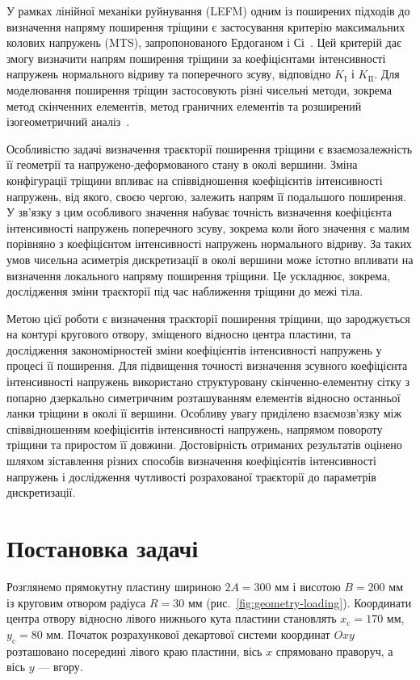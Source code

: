 \documentclass[a4paper,12pt]{article}
\newcommand{\PlateAMM}{300}
\newcommand{\HoleRMM}{30}
\begin{document}
У рамках лінійної механіки руйнування (LEFM) одним із поширених підходів до визначення напряму поширення тріщини
є застосування критерію максимальних колових напружень (MTS), запропонованого Ердоганом і Сі~\cite{ErdoganSih1963}.
Цей критерій дає змогу визначити напрям поширення тріщини за коефіцієнтами інтенсивності напружень нормального відриву
та поперечного зсуву, відповідно $K_{\mathrm I}$ і $K_{\mathrm{II}}$.
Для моделювання поширення тріщин застосовують різні чисельні методи, зокрема метод скінченних елементів,
метод граничних елементів та розширений ізогеометричний аналіз~\cite{BouchardEtAl2003,LiuLiXie2017,FangEtAl2020,AlshoaibiFageehi2022}.

Особливістю задачі визначення траєкторії поширення тріщини є взаємозалежність її геометрії та напружено-деформованого стану
в околі вершини. Зміна конфігурації тріщини впливає на співвідношення коефіцієнтів інтенсивності напружень,
від якого, своєю чергою, залежить напрям її подальшого поширення.
У зв’язку з цим особливого значення набуває точність визначення коефіцієнта інтенсивності напружень поперечного зсуву,
зокрема коли його значення є малим порівняно з коефіцієнтом інтенсивності напружень нормального відриву.
За таких умов чисельна асиметрія дискретизації в околі вершини може істотно впливати на визначення локального напряму поширення тріщини.
Це ускладнює, зокрема, дослідження зміни траєкторії під час наближення тріщини до межі тіла.

Метою цієї роботи є визначення траєкторії поширення тріщини, що зароджується на контурі кругового отвору,
зміщеного відносно центра пластини, та дослідження закономірностей зміни коефіцієнтів інтенсивності напружень у процесі її поширення.
Для підвищення точності визначення зсувного коефіцієнта інтенсивності напружень використано структуровану скінченно-елементну сітку
з попарно дзеркально симетричним розташуванням елементів відносно останньої ланки тріщини в околі її вершини.
Особливу увагу приділено взаємозв’язку між співвідношенням коефіцієнтів інтенсивності напружень, напрямом повороту тріщини
та приростом її довжини. Достовірність отриманих результатів оцінено шляхом зіставлення різних способів визначення
коефіцієнтів інтенсивності напружень і дослідження чутливості розрахованої траєкторії до параметрів дискретизації.

\section{Постановка задачі}
\label{sec:problem}
Розглянемо прямокутну пластину шириною $2A=\PlateAMM$ мм і висотою $B=200$ мм із круговим отвором
радіуса $R=\HoleRMM$ мм (рис.~\ref{fig:geometry-loading}). Координати центра отвору відносно лівого нижнього
кута пластини становлять $x_{\mathrm c}=170$ мм, $y_{\mathrm c}=80$ мм. Початок розрахункової декартової
системи координат $Oxy$ розташовано посередині лівого краю пластини, вісь $x$ спрямовано праворуч,
а вісь $y$ --- вгору.
\end{document}
